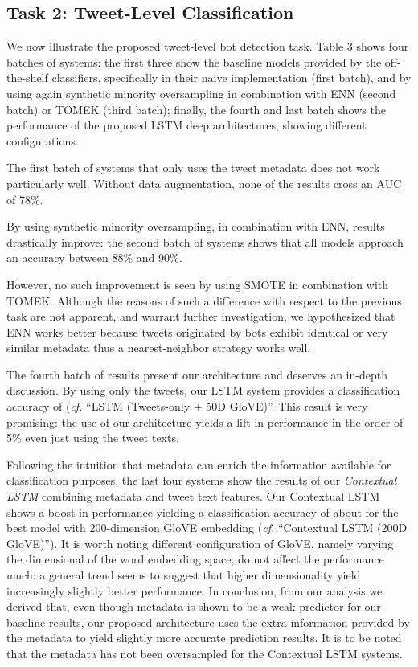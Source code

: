 










\subsection{Task 2: Tweet-Level Classification}

We now illustrate the proposed tweet-level bot detection task. 
Table 3 shows four batches of systems: the first three show the baseline models provided by the off-the-shelf classifiers, specifically in their naive implementation (first batch), and by using again synthetic minority oversampling in combination with ENN (second batch) or TOMEK (third batch); finally, the fourth and last batch shows the performance of the proposed LSTM deep architectures, showing different configurations.

The first batch of systems that only uses the tweet metadata does not work particularly well. Without data augmentation, none of the results cross an AUC of 78\%. 

By using synthetic minority oversampling, in combination with ENN, results drastically improve: the second batch of systems shows that all models approach an accuracy between 88\% and 90\%. 

However, no such improvement is seen by using SMOTE in combination with TOMEK. Although the reasons of such a difference with respect to the previous task are not apparent, and warrant further investigation, we hypothesized that ENN works better because tweets originated by bots exhibit identical or very similar metadata thus a nearest-neighbor strategy works well. \par 

The fourth batch of results present our architecture and deserves an in-depth discussion.
By using only the tweets, our LSTM system provides a classification accuracy of  (\textit{cf.} ``LSTM (Tweets-only + 50D GloVE)''. This result is very promising: the use of our architecture yields a lift in performance in the order of 5\% even just using the tweet texts. 

Following the intuition that metadata can enrich the information available for classification purposes, the last four systems show the results of our \textit{Contextual LSTM} combining metadata and tweet text features. Our Contextual LSTM shows a boost in performance yielding a classification accuracy of about  for the best model with 200-dimension GloVE embedding (\textit{cf.} ``Contextual LSTM (200D GloVE)''). It is worth noting different configuration of GloVE, namely varying the dimensional of the word embedding space, do not affect the performance much: a general trend seems to suggest that higher dimensionality yield increasingly slightly better performance.
In conclusion, from our analysis we derived that, even though metadata is shown to be a weak predictor for our baseline results, our proposed architecture uses the extra information provided by the metadata to yield slightly more accurate prediction results. It is to be noted that the metadata has not been oversampled for the Contextual LSTM systems. \par

